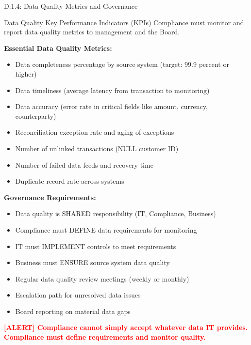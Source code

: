 \documentclass[11pt,a4paper]{beamer}
\newcommand{\redflag}[1]{\textcolor{red}{\textbf{[ALERT] #1}}}
\begin{document}
\begin{frame}{D.1.4: Data Quality Metrics and Governance}
	\begin{block}{Data Quality Key Performance Indicators (KPIs)}
		Compliance must monitor and report data quality metrics to management and the Board.
	\end{block}
	\textbf{Essential Data Quality Metrics:}
	\begin{itemize}
		\item Data completeness percentage by source system (target: 99.9 percent or higher)
		\item Data timeliness (average latency from transaction to monitoring)
		\item Data accuracy (error rate in critical fields like amount, currency, counterparty)
		\item Reconciliation exception rate and aging of exceptions
		\item Number of unlinked transactions (NULL customer ID)
		\item Number of failed data feeds and recovery time
		\item Duplicate record rate across systems
	\end{itemize}
	\textbf{Governance Requirements:}
	\begin{itemize}
		\item Data quality is SHARED responsibility (IT, Compliance, Business)
		\item Compliance must DEFINE data requirements for monitoring
		\item IT must IMPLEMENT controls to meet requirements
		\item Business must ENSURE source system data quality
		\item Regular data quality review meetings (weekly or monthly)
		\item Escalation path for unresolved data issues
		\item Board reporting on material data gaps
	\end{itemize}
	\redflag{Compliance cannot simply accept whatever data IT provides. Compliance must define requirements and monitor quality.}
\end{frame}
\end{document}
